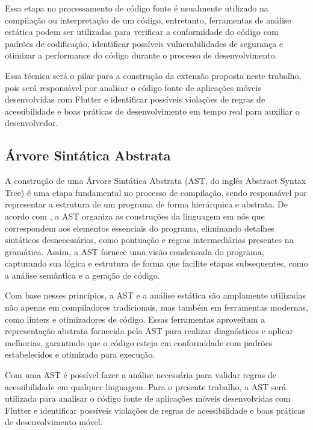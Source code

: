 Essa etapa no processamento de código fonte é usualmente utilizado na compilação ou interpretação de um código, entretanto, ferramentas de análise estática podem ser utilizadas para verificar a conformidade do código com padrões de codificação, identificar possíveis vulnerabilidades de segurança e otimizar a performance do código durante o processo de desenvolvimento.

Essa técnica será o pilar para a construção da extensão proposta neste trabalho, pois será responsável por analisar o código fonte de aplicações móveis desenvolvidas com Flutter e identificar possíveis violações de regras de acessibilidade e boas práticas de desenvolvimento em tempo real para auxiliar o desenvolvedor.

\subsection[AST]{Árvore Sintática Abstrata}

A construção de uma Árvore Sintática Abstrata (AST, do inglês Abstract Syntax Tree) é uma etapa fundamental no processo de compilação, sendo responsável por representar a estrutura de um programa de forma hierárquica e abstrata. De acordo com \cite{livrododragao}, a AST organiza as construções da linguagem em nós que correspondem aos elementos essenciais do programa, eliminando detalhes sintáticos desnecessários, como pontuação e regras intermediárias presentes na gramática. Assim, a AST fornece uma visão condensada do programa, capturando sua lógica e estrutura de forma que facilite etapas subsequentes, como a análise semântica e a geração de código.

Com base nesses princípios, a AST e a análise estática são amplamente utilizadas não apenas em compiladores tradicionais, mas também em ferramentas modernas, como linters e otimizadores de código. Essas ferramentas aproveitam a representação abstrata fornecida pela AST para realizar diagnósticos e aplicar melhorias, garantindo que o código esteja em conformidade com padrões estabelecidos e otimizado para execução.

Com uma AST é possível fazer a análise necessária para validar regras de acessibilidade em qualquer linguagem. Para o presente trabalho, a AST será utilizada para analisar o código fonte de aplicações móveis desenvolvidas com Flutter e identificar possíveis violações de regras de acessibilidade e boas práticas de desenvolvimento móvel.